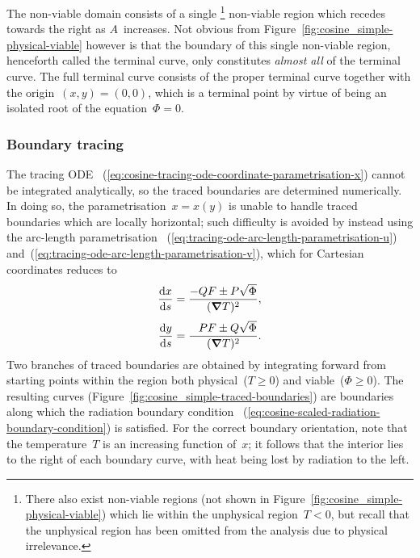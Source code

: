The non-viable domain consists of a single%
\footnote{
  There also exist non-viable regions
  (not shown in Figure~\ref{fig:cosine_simple-physical-viable})
  which lie within the unphysical region~$T < 0$,
  but recall that the unphysical region has been omitted from the analysis
  due to physical irrelevance.
}
non-viable region which recedes towards the right as $A$~increases.
Not obvious from Figure~\ref{fig:cosine_simple-physical-viable} however
is that the boundary of this single non-viable region,
henceforth called the  terminal curve,
only constitutes \emph{almost all} of the terminal curve.
The full terminal curve consists of the proper terminal curve
together with the origin~$(x, y) = (0, 0)$,
which is a terminal point
by virtue of being an isolated root of the equation~$\Phi = 0$.

\begin{figure}
\end{figure}

\subsubsection{Boundary tracing}
\label{sec:cartesian.cosine.simple.tracing}

The tracing ODE~%
  (\ref{eq:cosine-tracing-ode-coordinate-parametrisation-x})
cannot be integrated analytically,
so the traced boundaries are determined numerically.
In doing so, the parametrisation~$x = x (y)$
is unable to handle traced boundaries which are locally horizontal;
such difficulty is avoided by instead using the arc-length parametrisation~%
  (\ref{eq:tracing-ode-arc-length-parametrisation-u})
and~(\ref{eq:tracing-ode-arc-length-parametrisation-v}),
which for Cartesian coordinates reduces to
\begin{align}
  \tder{x}{s} &= \frac{-Q F \pm P \sqrt{\Phi}}{(\del T)^2},
    \label{eq:cosine-tracing-ode-arc-length-parametrisation-x} \\[\tallspace]
  \tder{y}{s} &= \frac{\+P F \pm Q \sqrt{\Phi}}{(\del T)^2}.
    \label{eq:cosine-tracing-ode-arc-length-parametrisation-y}
\end{align}
Two branches of traced boundaries are obtained
by integrating forward
from starting points within the region
both physical~($T \ge 0$) and viable~($\Phi \ge 0$).
The resulting curves (Figure~\ref{fig:cosine_simple-traced-boundaries})
are boundaries along which the radiation boundary condition~%
  (\ref{eq:cosine-scaled-radiation-boundary-condition})
is satisfied.
For the correct boundary orientation,
note that the temperature~$T$ is an increasing function of~$x$;
it follows that the interior lies to the right of each boundary curve,
with heat being lost by radiation to the left.

